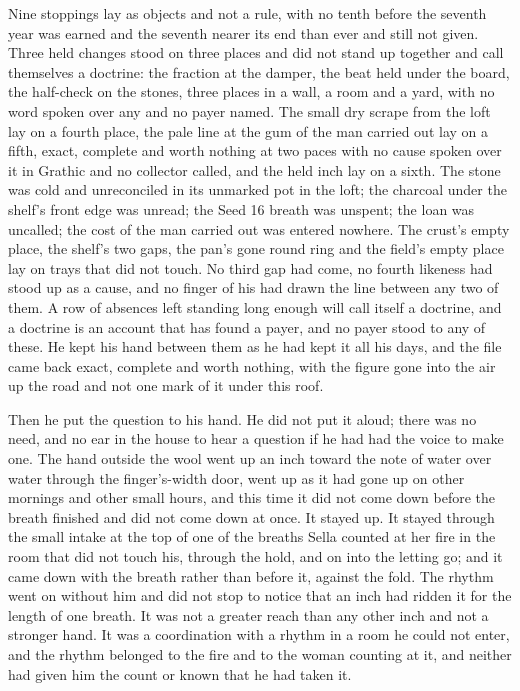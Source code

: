 Nine stoppings lay as objects and not a rule, with no tenth before the seventh year was earned and the seventh nearer its end than ever and still not given. Three held changes stood on three places and did not stand up together and call themselves a doctrine: the fraction at the damper, the beat held under the board, the half-check on the stones, three places in a wall, a room and a yard, with no word spoken over any and no payer named. The small dry scrape from the loft lay on a fourth place, the pale line at the gum of the man carried out lay on a fifth, exact, complete and worth nothing at two paces with no cause spoken over it in Grathic and no collector called, and the held inch lay on a sixth. The stone was cold and unreconciled in its unmarked pot in the loft; the charcoal under the shelf's front edge was unread; the Seed 16 breath was unspent; the loan was uncalled; the cost of the man carried out was entered nowhere. The crust's empty place, the shelf's two gaps, the pan's gone round ring and the field's empty place lay on trays that did not touch. No third gap had come, no fourth likeness had stood up as a cause, and no finger of his had drawn the line between any two of them. A row of absences left standing long enough will call itself a doctrine, and a doctrine is an account that has found a payer, and no payer stood to any of these. He kept his hand between them as he had kept it all his days, and the file came back exact, complete and worth nothing, with the figure gone into the air up the road and not one mark of it under this roof.

Then he put the question to his hand. He did not put it aloud; there was no need, and no ear in the house to hear a question if he had had the voice to make one. The hand outside the wool went up an inch toward the note of water over water through the finger's-width door, went up as it had gone up on other mornings and other small hours, and this time it did not come down before the breath finished and did not come down at once. It stayed up. It stayed through the small intake at the top of one of the breaths Sella counted at her fire in the room that did not touch his, through the hold, and on into the letting go; and it came down with the breath rather than before it, against the fold. The rhythm went on without him and did not stop to notice that an inch had ridden it for the length of one breath. It was not a greater reach than any other inch and not a stronger hand. It was a coordination with a rhythm in a room he could not enter, and the rhythm belonged to the fire and to the woman counting at it, and neither had given him the count or known that he had taken it.

